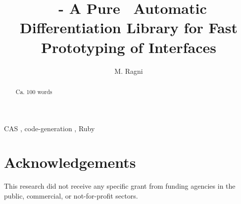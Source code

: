 \documentclass[preprint, 12pt, a4paper, review]{elsarticle}
\begin{document}
\begin{frontmatter}

\title{\ragnicas~- A Pure \Ruby~Automatic Differentiation Library for Fast Prototyping of Interfaces}

\author[ragni]{M. Ragni}
\address[ragni]{Department of Industrial Engineering, University of Trento, 9, Sommarive, Povo di Trento, Italy}

\begin{abstract}

Ca. 100 words

\end{abstract}

\begin{keyword}
CAS \sep{} code-generation \sep{} Ruby
\end{keyword}

\end{frontmatter}

\linenumbers{}








\section*{Acknowledgements}
\label{sec:acknowledgements}
This research did not receive any specific grant from funding agencies in the public, commercial, or not-for-profit sectors.









\end{document}
